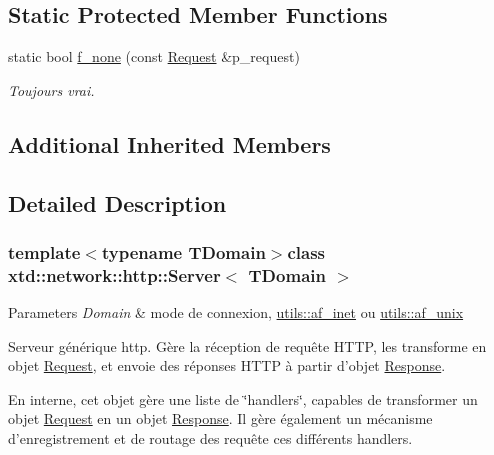 \subsection*{Static Protected Member Functions}
\begin{DoxyCompactItemize}
\item 
static bool \hyperlink{classxtd_1_1network_1_1http_1_1Server_a1007cdff295e30f0009f07c70e8bafcc}{f\-\_\-none} (const \hyperlink{classxtd_1_1network_1_1http_1_1Request}{Request} \&p\-\_\-request)
\begin{DoxyCompactList}\small\item\em Toujours vrai. \end{DoxyCompactList}\end{DoxyCompactItemize}
\subsection*{Additional Inherited Members}


\subsection{Detailed Description}
\subsubsection*{template$<$typename T\-Domain$>$class xtd\-::network\-::http\-::\-Server$<$ T\-Domain $>$}

\par
\par
 


\begin{DoxyParams}{Parameters}
{\em Domain} & mode de connexion, \hyperlink{namespacextd_1_1network_1_1utils_a6238bab7a616eda8c9424721444a18d1}{utils\-::af\-\_\-inet} ou \hyperlink{namespacextd_1_1network_1_1utils_a60e83921a2d026f07b49fa094988acdf}{utils\-::af\-\_\-unix}\\
\hline
\end{DoxyParams}
Serveur générique http. Gère la réception de requête H\-T\-T\-P, les transforme en objet \hyperlink{classxtd_1_1network_1_1http_1_1Request}{Request}, et envoie des réponses H\-T\-T\-P à partir d'objet \hyperlink{classxtd_1_1network_1_1http_1_1Response}{Response}.

En interne, cet objet gère une liste de \char`\"{}handlers\char`\"{}, capables de transformer un objet \hyperlink{classxtd_1_1network_1_1http_1_1Request}{Request} en un objet \hyperlink{classxtd_1_1network_1_1http_1_1Response}{Response}. Il gère également un mécanisme d'enregistrement et de routage des requête ces différents handlers.

